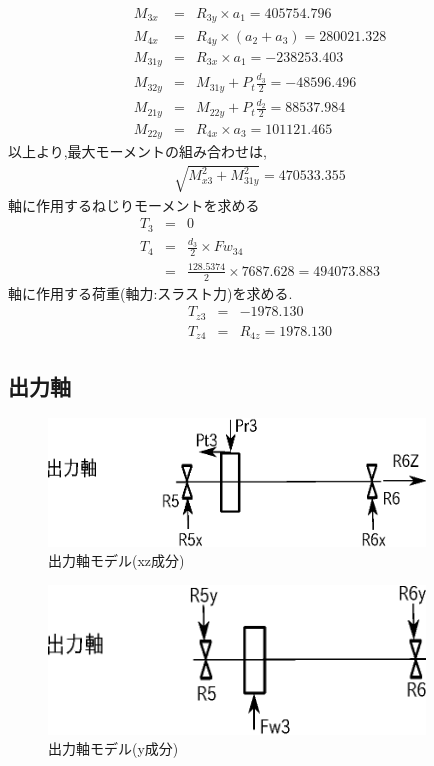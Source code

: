 \begin{eqnarray}
M_{3x} &=& R_{3y} \times a_1=405754.796\\
M_{4x} &=& R_{4y} \times (a_2+a_3)=280021.328\\
M_{31y} &=& R_{3x} \times a_1=-238253.403\\
M_{32y} &=& M_{31y} + P_t \frac{d_3}{2}=-48596.496\\
M_{21y} &=& M_{22y} + P_t \frac{d_2}{2}=88537.984\\
M_{22y} &=& R_{4x} \times a_3=101121.465
\end{eqnarray}
以上より,最大モーメントの組み合わせは,
\begin{eqnarray}
\sqrt{ M_{x3}^2 + M_{31y}^2 } = 470533.355
\end{eqnarray}
軸に作用するねじりモーメントを求める
\begin{eqnarray}
T_{3} &=& 0\\
T_{4} &=& \frac{d_3}{2} \times Fw_{34}\\
      &=& \frac{128.5374}{2} \times 7687.628 = 494073.883
\end{eqnarray}
軸に作用する荷重(軸力:スラスト力)を求める.
\begin{eqnarray}
T_{z3} &=& -1978.130\\
T_{z4} &=& R_{4z} = 1978.130
\end{eqnarray}

\subsection{出力軸}
\begin{figure}[htbp]
\begin{center}
\includegraphics[width=10cm]{../picture/jiku3.eps}
\end{center}
\caption{出力軸モデル(xz成分)}
\end{figure}
\begin{figure}[htbp]
\begin{center}
\includegraphics[width=10cm]{../picture/jiku32.eps}
\end{center}
\caption{出力軸モデル(y成分)}
\end{figure}
